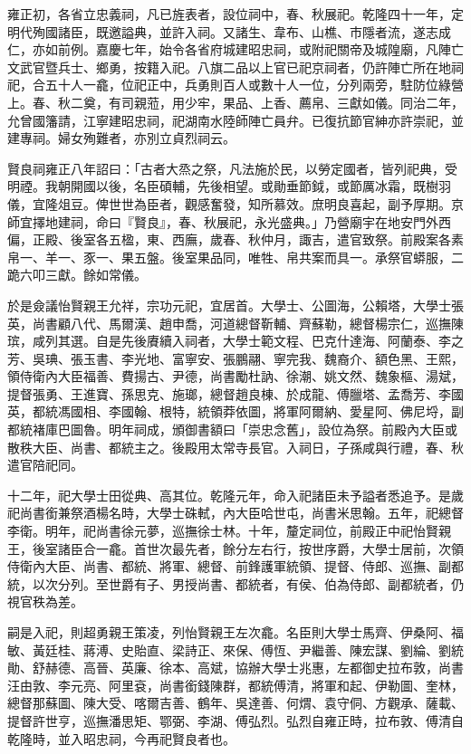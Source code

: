 \begin{pinyinscope}
雍正初，各省立忠義祠，凡已旌表者，設位祠中，春、秋展祀。乾隆四十一年，定明代殉國諸臣，既邀謚典，並許入祠。又諸生、韋布、山樵、市隱者流，遂志成仁，亦如前例。嘉慶七年，始令各省府城建昭忠祠，或附祀關帝及城隍廟，凡陣亡文武官暨兵士、鄉勇，按籍入祀。八旗二品以上官已祀京祠者，仍許陣亡所在地祠祀，合五十人一龕，位祀正中，兵勇則百人或數十人一位，分列兩旁，駐防位綠營上。春、秋二奠，有司親蒞，用少牢，果品、上香、薦帛、三獻如儀。同治二年，允曾國籓請，江寧建昭忠祠，祀湖南水陸師陣亡員弁。已復抗節官紳亦許崇祀，並建專祠。婦女殉難者，亦別立貞烈祠云。

賢良祠雍正八年詔曰：「古者大烝之祭，凡法施於民，以勞定國者，皆列祀典，受明禋。我朝開國以後，名臣碩輔，先後相望。或勛垂節鉞，或節厲冰霜，既樹羽儀，宜隆俎豆。俾世世為臣者，觀感奮發，知所慕效。庶明良喜起，副予厚期。京師宜擇地建祠，命曰『賢良』，春、秋展祀，永光盛典。」乃營廟宇在地安門外西偏，正殿、後室各五楹，東、西廡，歲春、秋仲月，諏吉，遣官致祭。前殿案各素帛一、羊一、豕一、果五盤。後室果品同，唯牲、帛共案而具一。承祭官蟒服，二跪六叩三獻。餘如常儀。

於是僉議怡賢親王允祥，宗功元祀，宜居首。大學士、公圖海，公賴塔，大學士張英，尚書顧八代、馬爾漢、趙申喬，河道總督靳輔、齊蘇勒，總督楊宗仁，巡撫陳瑸，咸列其選。自是先後賡續入祠者，大學士範文程、巴克什達海、阿蘭泰、李之芳、吳琠、張玉書、李光地、富寧安、張鵬翮、寧完我、魏裔介、額色黑、王熙，領侍衛內大臣福善、費揚古、尹德，尚書勵杜訥、徐潮、姚文然、魏象樞、湯斌，提督張勇、王進寶、孫思克、施瑯，總督趙良棟、於成龍、傅臘塔、孟喬芳、李國英，都統馮國相、李國翰、根特，統領莽依圖，將軍阿爾納、愛星阿、佛尼埒，副都統褚庫巴圖魯。明年祠成，頒御書額曰「崇忠念舊」，設位為祭。前殿內大臣或散秩大臣、尚書、都統主之。後殿用太常寺長官。入祠日，子孫咸與行禮，春、秋遣官陪祀同。

十二年，祀大學士田從典、高其位。乾隆元年，命入祀諸臣未予謚者悉追予。是歲祀尚書銜兼祭酒楊名時，大學士硃軾，內大臣哈世屯，尚書米思翰。五年，祀總督李衛。明年，祀尚書徐元夢，巡撫徐士林。十年，釐定祠位，前殿正中祀怡賢親王，後室諸臣合一龕。首世次最先者，餘分左右行，按世序爵，大學士居前，次領侍衛內大臣、尚書、都統、將軍、總督、前鋒護軍統領、提督、侍郎、巡撫、副都統，以次分列。至世爵有子、男授尚書、都統者，有侯、伯為侍郎、副都統者，仍視官秩為差。

嗣是入祀，則超勇親王策凌，列怡賢親王左次龕。名臣則大學士馬齊、伊桑阿、福敏、黃廷桂、蔣溥、史貽直、梁詩正、來保、傅恆、尹繼善、陳宏謀、劉綸、劉統勛、舒赫德、高晉、英廉、徐本、高斌，協辦大學士兆惠，左都御史拉布敦，尚書汪由敦、李元亮、阿里袞，尚書銜錢陳群，都統傅清，將軍和起、伊勒圖、奎林，總督那蘇圖、陳大受、喀爾吉善、鶴年、吳達善、何煟、袁守侗、方觀承、薩載、提督許世亨，巡撫潘思矩、鄂弼、李湖、傅弘烈。弘烈自雍正時，拉布敦、傅清自乾隆時，並入昭忠祠，今再祀賢良者也。


\end{pinyinscope}
